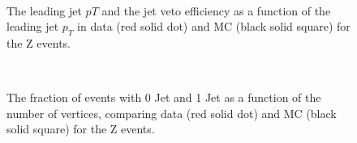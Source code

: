 \begin{figure}[!hbtp]
\centering
\subfigure[]{
\centering
\label{subfig:jetpt_z}
}
\subfigure[]{
\centering
\label{subfig:jetveto_z}
} \\
\caption{\fixme The leading jet $pT$  and the jet veto efficiency as a function 
of the leading jet $p_T$  in data (red solid dot) and MC (black solid square) for the Z events. }
\label{fig:jetveto_z}
\end{figure}

\begin{figure}[!hbtp]
\centering
\subfigure[]{
\centering
\label{subfig:zerojetfrac_z}
}
\subfigure[]{
\centering
\label{subfig:onejetfrac_z}
}\\
\caption{\fixme The fraction of events with 0 Jet  and 1 Jet  
as a function of the number of vertices, comparing data (red solid dot) and MC (black solid square) for the Z events. }
\label{fig:jetfrac_z}
\end{figure}



